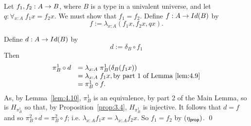 Let $f_1,f_2:A\ra B$, where $B$ is a type in a univalent universe, and let 
$q:\forall_{x:A}\; f_1x=f_2x$.  We must show that $f_1=f_2$.
Define $f:A\ra Id(B)$ by
  \[ f := \lambda_{x:A}(f_1x,f_2x,qx).\]

Define $d:A\ra Id(B)$ by
  \[ d:=\delta_B\circ f_1\]
Then
  \[\be{array}{ll}
\pi^1_B\circ d &=\lambda_{x:A}\;\pi^1_B(\delta_B(f_1x))\\
              &=\lambda_{x:A}\; f_1x, \mbox{by part 1 of Lemma~\ref{lem:4.9}}\\
              &=\pi^1_B\circ f.
  \en{array}\]
As, by Lemma~\ref{lem:4.10},
 $\pi^1_B$ is an equivalence, by part 2 of the Main Lemma, so is $H_{\pi^1_B}$ so that, by Proposition~\ref{prop:3.4},
$H_{\pi^1_B}$ is injective.  It follows that  $d=f$ and so 
$\pi^2_B\circ d =\pi^2_B\circ f$; i.e. $\lambda_{x:A}f_1x =\lambda_{x:A}f_2x$.
So $f_1=f_2$ by $(\eta_{\sf prop})$.
\qed 


